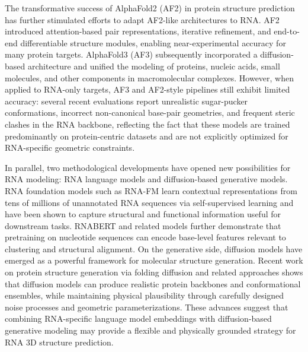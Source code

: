 The transformative success of AlphaFold2 (AF2) in protein structure prediction has further stimulated efforts to adapt AF2-like architectures to RNA\cite{Jumper2021AlphaFold}. AF2 introduced attention-based pair representations, iterative refinement, and end-to-end differentiable structure modules, enabling near-experimental accuracy for many protein targets. AlphaFold3 (AF3) subsequently incorporated a diffusion-based architecture and unified the modeling of proteins, nucleic acids, small molecules, and other components in macromolecular complexes\cite{Abramson2024AlphaFold3}. However, when applied to RNA-only targets, AF3 and AF2-style pipelines still exhibit limited accuracy: several recent evaluations report unrealistic sugar-pucker conformations, incorrect non-canonical base-pair geometries, and frequent steric clashes in the RNA backbone, reflecting the fact that these models are trained predominantly on protein-centric datasets and are not explicitly optimized for RNA-specific geometric constraints.

In parallel, two methodological developments have opened new possibilities for RNA modeling: RNA language models and diffusion-based generative models. RNA foundation models such as RNA-FM learn contextual representations from tens of millions of unannotated RNA sequences via self-supervised learning and have been shown to capture structural and functional information useful for downstream tasks\cite{Chen2022RNAFM}. RNABERT and related models further demonstrate that pretraining on nucleotide sequences can encode base-level features relevant to clustering and structural alignment\cite{Akiyama2022RNABERT}. On the generative side, diffusion models have emerged as a powerful framework for molecular structure generation. Recent work on protein structure generation via folding diffusion and related approaches shows that diffusion models can produce realistic protein backbones and conformational ensembles, while maintaining physical plausibility through carefully designed noise processes and geometric parameterizations\cite{Yim2024DiffusionReview, Wu2024FoldingDiffusion}. These advances suggest that combining RNA-specific language model embeddings with diffusion-based generative modeling may provide a flexible and physically grounded strategy for RNA 3D structure prediction.

